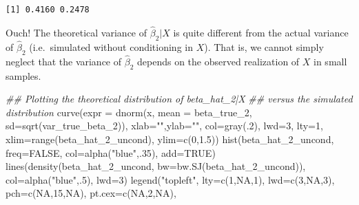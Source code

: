 \documentclass[
  letterpaper,
  DIV=11,
  numbers=noendperiod]{scrreprt}
\newenvironment{Shaded}{\begin{snugshade}}{\end{snugshade}}
\newcommand{\AttributeTok}[1]{\textcolor[rgb]{0.40,0.45,0.13}{#1}}
\newcommand{\ConstantTok}[1]{\textcolor[rgb]{0.56,0.35,0.01}{#1}}
\newcommand{\DecValTok}[1]{\textcolor[rgb]{0.68,0.00,0.00}{#1}}
\newcommand{\DocumentationTok}[1]{\textcolor[rgb]{0.37,0.37,0.37}{\textit{#1}}}
\newcommand{\FloatTok}[1]{\textcolor[rgb]{0.68,0.00,0.00}{#1}}
\newcommand{\FunctionTok}[1]{\textcolor[rgb]{0.28,0.35,0.67}{#1}}
\newcommand{\NormalTok}[1]{\textcolor[rgb]{0.00,0.23,0.31}{#1}}
\newcommand{\StringTok}[1]{\textcolor[rgb]{0.13,0.47,0.30}{#1}}
\theoremstyle{definition}
\theoremstyle{plain}
\theoremstyle{plain}
\theoremstyle{remark}
\begin{document}
\begin{verbatim}
[1] 0.4160 0.2478
\end{verbatim}

Ouch! The theoretical variance of \(\hat\beta_2|X\) is quite different
from the actual variance of \(\hat\beta_2\) (i.e.~simulated without
conditioning in \(X\)). That is, we cannot simply neglect that the
variance of \(\hat\beta_2\) depends on the observed realization of \(X\)
in small samples.

\begin{Shaded}
\begin{Highlighting}[]
\DocumentationTok{\#\# Plotting the theoretical distribution of beta\_hat\_2|X }
\DocumentationTok{\#\# versus the simulated distribution}
\FunctionTok{curve}\NormalTok{(}\AttributeTok{expr =} \FunctionTok{dnorm}\NormalTok{(x, }\AttributeTok{mean =}\NormalTok{ beta\_true\_2, }\AttributeTok{sd=}\FunctionTok{sqrt}\NormalTok{(var\_true\_beta\_2)), }
      \AttributeTok{xlab=}\StringTok{""}\NormalTok{,}\AttributeTok{ylab=}\StringTok{""}\NormalTok{, }\AttributeTok{col=}\FunctionTok{gray}\NormalTok{(.}\DecValTok{2}\NormalTok{), }\AttributeTok{lwd=}\DecValTok{3}\NormalTok{, }\AttributeTok{lty=}\DecValTok{1}\NormalTok{, }
      \AttributeTok{xlim=}\FunctionTok{range}\NormalTok{(beta\_hat\_2\_uncond), }\AttributeTok{ylim=}\FunctionTok{c}\NormalTok{(}\DecValTok{0}\NormalTok{,}\FloatTok{1.5}\NormalTok{))}
\FunctionTok{hist}\NormalTok{(beta\_hat\_2\_uncond, }\AttributeTok{freq=}\ConstantTok{FALSE}\NormalTok{, }\AttributeTok{col=}\FunctionTok{alpha}\NormalTok{(}\StringTok{"blue"}\NormalTok{,.}\DecValTok{35}\NormalTok{), }\AttributeTok{add=}\ConstantTok{TRUE}\NormalTok{)}
\FunctionTok{lines}\NormalTok{(}\FunctionTok{density}\NormalTok{(beta\_hat\_2\_uncond, }\AttributeTok{bw=}\FunctionTok{bw.SJ}\NormalTok{(beta\_hat\_2\_uncond)), }
      \AttributeTok{col=}\FunctionTok{alpha}\NormalTok{(}\StringTok{"blue"}\NormalTok{,.}\DecValTok{5}\NormalTok{), }\AttributeTok{lwd=}\DecValTok{3}\NormalTok{)}
\FunctionTok{legend}\NormalTok{(}\StringTok{"topleft"}\NormalTok{, }\AttributeTok{lty=}\FunctionTok{c}\NormalTok{(}\DecValTok{1}\NormalTok{,}\ConstantTok{NA}\NormalTok{,}\DecValTok{1}\NormalTok{), }\AttributeTok{lwd=}\FunctionTok{c}\NormalTok{(}\DecValTok{3}\NormalTok{,}\ConstantTok{NA}\NormalTok{,}\DecValTok{3}\NormalTok{), }\AttributeTok{pch=}\FunctionTok{c}\NormalTok{(}\ConstantTok{NA}\NormalTok{,}\DecValTok{15}\NormalTok{,}\ConstantTok{NA}\NormalTok{), }\AttributeTok{pt.cex=}\FunctionTok{c}\NormalTok{(}\ConstantTok{NA}\NormalTok{,}\DecValTok{2}\NormalTok{,}\ConstantTok{NA}\NormalTok{),}

\end{Highlighting}
\end{Shaded}
\end{document}
